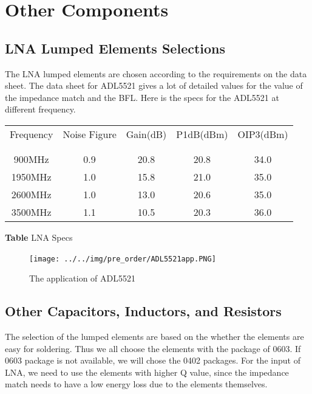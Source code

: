 \documentclass[]{article}
\begin{document}
\section{Other Components}
    
    \subsection{LNA Lumped Elements Selections} 
        The LNA lumped elements are chosen according to the requirements on the
        data sheet. The data sheet for ADL5521 gives a lot of detailed values
        for the value of the impedance match and the BFL.  Here is the specs for
        the ADL5521 at different frequency.

        \begin{center}
            \begin{tabular}{c c c c c}
                Frequency & Noise Figure & Gain(dB) & P1dB(dBm) & OIP3(dBm) \\ \\ \hline \\
                900MHz & 0.9 & 20.8 & 20.8 & 34.0\\
                1950MHz & 1.0 & 15.8 & 21.0 & 35.0\\
                2600MHz & 1.0 & 13.0 & 20.6 & 35.0\\
                3500MHz & 1.1 & 10.5 & 20.3 & 36.0
            \end{tabular}
        \end{center}

        \begin{center}
            \textbf{Table} LNA Specs
        \end{center}

        \begin{figure}[p]
            \begin{center}
                \texttt{[image: ../../img/pre\_order/ADL5521app.PNG]}~
                \label{ADL5521}
                \caption{The application of ADL5521}
            \end{center}
        \end{figure}

    \subsection{Other Capacitors, Inductors, and Resistors}
        The selection of the lumped elements are based on the whether the
        elements are easy for soldering. Thus we all choose the elements with
        the package of 0603. If 0603 package is not available, we will chose the
        0402 packages. For the input of LNA, we need to use the elements with
        higher Q value, since the impedance match needs to have a low energy
        loss due to the elements themselves.
\end{document}
